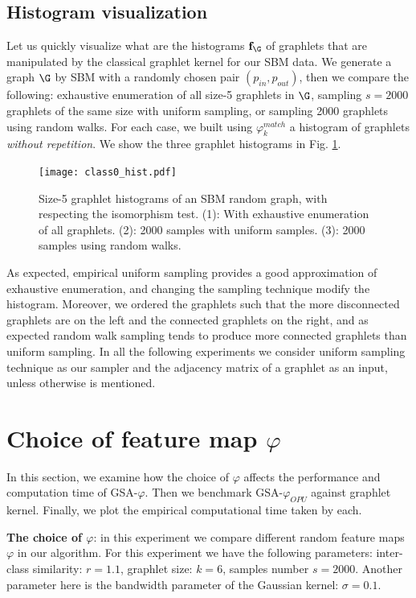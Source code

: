 \subsection{Histogram visualization}
Let us quickly visualize what are the histograms $\mathbf{f}_\G$ of graphlets that are manipulated by the classical graphlet kernel for our SBM data. We generate a graph $\G$ by SBM with a randomly chosen pair $(p_{in},p_{out})$, then we compare the following: exhaustive enumeration of all size-5 graphlets in $\G$, sampling $s=2000$ graphlets of the same size with uniform sampling, or sampling 2000 graphlets using random walks. For each case, we built using $\varphi^{match}_k$ a histogram of graphlets \emph{without repetition}. We show the three graphlet histograms in Fig. \ref{fig:graphlet_hist}. 

\begin{figure}[H]
\centering
\texttt{[image: class0\_hist.pdf]}
\caption[Graphlet histograms of uniform and random walk sampling techniques]{Size-5 graphlet histograms of an SBM random graph, with respecting the isomorphism test. (1): With exhaustive enumeration of all graphlets. (2): 2000 samples with uniform samples. (3): 2000 samples using random walks. }
\label{fig:graphlet_hist}
\end{figure}

As expected, empirical uniform sampling provides a good approximation of exhaustive enumeration, and changing the sampling technique modify the histogram. Moreover, we ordered the graphlets such that the more disconnected graphlets are on the left and the connected graphlets on the right, and as expected random walk sampling tends to produce more connected graphlets than uniform sampling. In all the  following experiments we consider uniform sampling technique as our sampler and the adjacency matrix of a graphlet as an input, unless otherwise is mentioned.
\section{Choice of feature map $\varphi$ }
\label{section:choice}
In this section, we examine how the choice of $\varphi$ affects the performance and computation time of GSA-$\varphi$. Then we benchmark GSA-$\varphi_{OPU}$ against graphlet kernel. Finally, we plot the empirical computational time taken by each. 

\textbf{The choice of $\varphi$}: in this experiment we compare different random feature maps $\varphi$ in our algorithm. For this experiment we have the following parameters:  inter-class similarity: $r=1.1$, graphlet size: $k=6$, samples number $s=2000$. Another parameter here is the bandwidth parameter of the Gaussian kernel: $\sigma=0.1$.

